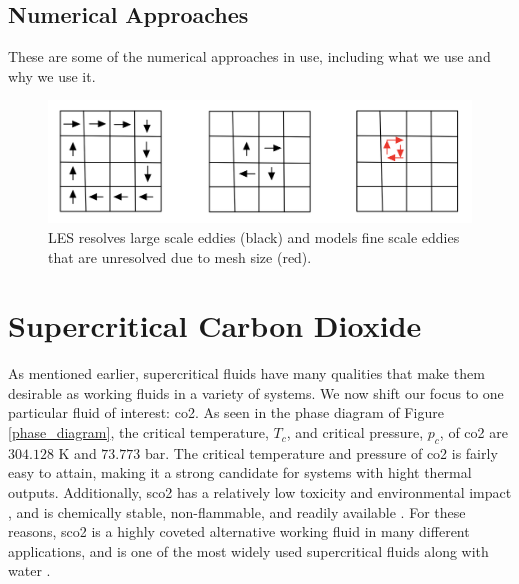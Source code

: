 \subsection{Numerical Approaches}
These are some of the numerical approaches in use, including what we use and why we use it. 
\begin{figure}[h!]
\begin{center}
\includegraphics[scale=0.5]{figures/LES_grid}
\end{center}
\caption{LES resolves large scale eddies (black) and models fine scale eddies that are unresolved due to mesh size (red).}
\label{LES_grid}
\end{figure}

\section{Supercritical Carbon Dioxide}
As mentioned earlier, supercritical fluids have many qualities that make them desirable as working fluids in a variety of systems. We now shift our focus to one particular fluid of interest: \gls{co2}. As seen in the phase diagram of Figure \ref{phase_diagram}, the critical temperature, $T_c$, and critical pressure, $p_c$, of \gls{co2} are $304.128 $ K and $73.773$ bar. The critical temperature and pressure of \gls{co2} is fairly easy to attain, making it a strong candidate for systems with hight thermal outputs. Additionally, \gls{sco2} has a relatively low toxicity and environmental impact \cite{}, and is chemically stable, non-flammable, and readily available \cite{}. For these reasons, \gls{sco2} is a highly coveted alternative working fluid in many different applications, and is one of the most widely used supercritical fluids along with water \cite{SCF2}. 

